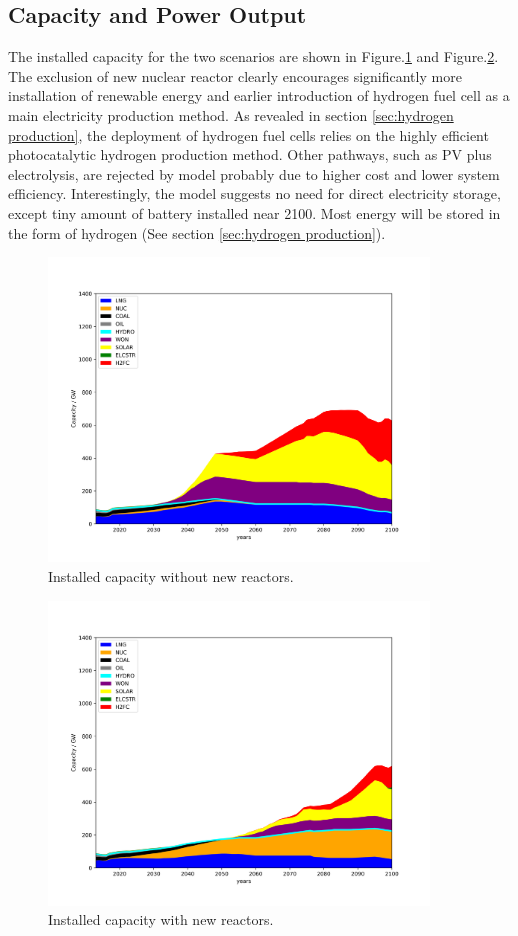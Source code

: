 \documentclass[14pt,a4paper]{article} %
\begin{document}
\subsection{Capacity and Power Output}
The installed capacity for the two scenarios are shown in Figure.\ref{fig:nonuccap} and Figure.\ref{fig:nuccap}. The exclusion of new nuclear reactor clearly encourages significantly more installation of renewable energy and earlier introduction of hydrogen fuel cell as a main electricity production method. As revealed in section \ref{sec:hydrogen production}, the deployment of hydrogen fuel cells relies on the highly efficient photocatalytic hydrogen production method. Other pathways, such as PV plus electrolysis, are rejected by model probably due to higher cost and lower system efficiency. Interestingly, the model suggests no need for direct electricity storage, except tiny amount of battery installed near 2100. Most energy will be stored in the form of hydrogen (See section \ref{sec:hydrogen production}). 
\begin{figure}[H]
  \centering
    \includegraphics[width=0.9\textwidth]{./plot/nonuc_cap.png}
  \caption{Installed capacity without new reactors.}
  \label{fig:nonuccap}
\end{figure}
\begin{figure}[H]
  \centering
    \includegraphics[width=0.9\textwidth]{./plot/nuc_cap.png}
  \caption{Installed capacity with new reactors.}
  \label{fig:nuccap}
\end{figure}
\end{document}
